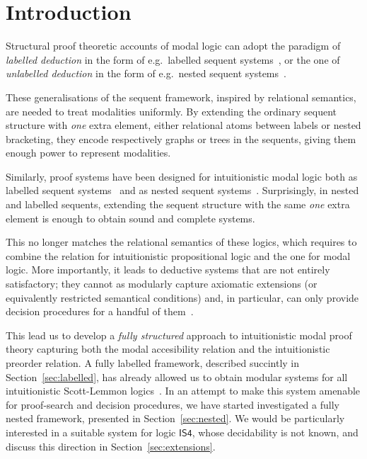 \documentclass[twoside]{aiml20}
\begin{document}
\section{Introduction}
Structural proof theoretic accounts of modal logic can adopt the paradigm of \emph{labelled deduction} in the form of e.g.~labelled sequent systems~\cite{vigano2000,negri2005}, or the one of \emph{unlabelled deduction} in the form of e.g.~nested sequent systems~\cite{brunnler2009,poggiolesi2009}.

These generalisations of the sequent framework, inspired by relational semantics, are needed to treat modalities uniformly. 
%
By extending the ordinary sequent structure with \emph{one} extra element, either relational atoms between labels or nested bracketing, they encode respectively graphs or trees in the sequents, giving them enough power to represent modalities. 

Similarly, proof systems have been designed for intuitionistic modal logic both as labelled sequent systems~\cite{simpson1994} and as nested sequent systems~\cite{strassburger2013,kuznets:strassburger:maehara,galmiche2018}.
%
Surprisingly, in nested and labelled sequents, extending the sequent structure with the same \emph{one} extra element is enough to obtain sound and complete systems.
%

This no longer matches the relational semantics of these logics, which requires to combine the relation for intuitionistic propositional logic and the one for modal logic. 
%
More importantly, it leads to deductive systems that are not entirely satisfactory; they cannot as modularly capture axiomatic extensions (or equivalently restricted semantical conditions) and, in particular, can only provide decision procedures for a handful of them~\cite{simpson1994}.

This lead us to develop a \emph{fully structured} approach to intuitionistic modal proof theory capturing both the modal accesibility relation and the intuitionistic preorder relation. 
%
A fully labelled framework, described succintly in Section~\ref{sec:labelled}, has already allowed us to obtain modular systems for all intuitionistic Scott-Lemmon logics~\cite{marin:morales:strassburger:hal}. 
%
In an attempt to make this system amenable for proof-search and decision procedures, we have started investigated a fully nested framework, presented in Section~\ref{sec:nested}.
%
We would be particularly interested in a suitable system for logic $\mathsf{IS4}$, whose decidability is not known, and discuss this direction in Section~\ref{sec:extensions}.
\end{document}
